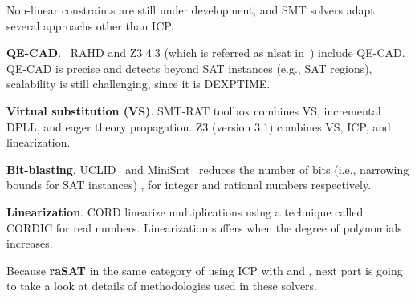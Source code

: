 \documentclass[runningheads,a4paper,oribibl]{llncs}
\newcommand{\mizuhito}[1]{\{{\bf Mizuhito:~\sf #1}\}} %
\begin{document}
Non-linear constraints are still under development, and SMT solvers adapt 
several approachs other than ICP. 

\medskip \noindent
\textbf{QE-CAD}. ~RAHD \cite{Passmore09combineddecision} and 
Z3 4.3 (which is referred as nlsat in~\cite{Jovanovic13}) include QE-CAD. 
QE-CAD is precise and detects beyond SAT instances (e.g., SAT regions), 
scalability is still challenging, since it is DEXPTIME. 

\medskip \noindent
\textbf{Virtual substitution (VS)}.
SMT-RAT toolbox \cite{smtrat} combines 
VS, incremental DPLL, and %
eager theory propagation. 
Z3 (version 3.1) %
combines VS, ICP, and linearization.

\medskip \noindent
\textbf{Bit-blasting}. %
UCLID~\cite{Bryant07decidingbit-vector} and MiniSmt~\cite{Zankl:2010:SNR:1939141.1939168} reduces the number of bits (i.e., narrowing bounds for SAT instances) 
, %
for integer and rational numbers respectively. %

\medskip \noindent
\textbf{Linearization}. %
CORD \cite{cordic} %
linearize multiplications using a technique called 
CORDIC for real numbers. 
Linearization suffers when the degree of polynomials increases. 

Because \textbf{raSAT} in the same category of using ICP with  and , next part is going to take a look at details of methodologies used in these solvers.
\end{document}
